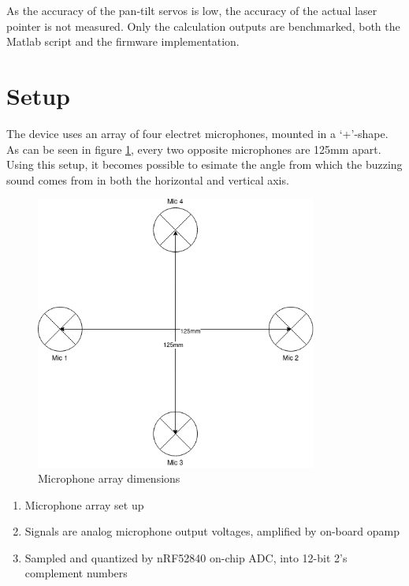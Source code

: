 \documentclass[a4paper]{article}
\begin{document}
As the accuracy of the pan-tilt servos is low, the accuracy of the actual laser pointer is not measured. Only the calculation outputs are benchmarked, both the Matlab script and the firmware implementation.

\section{Setup}

The device uses an array of four electret microphones, mounted in a `+'-shape. As can be seen in figure \ref{fig:mic_array_dimensions}, every two opposite microphones are 125mm apart. Using this setup, it becomes possible to esimate the angle from which the buzzing sound comes from in both the horizontal and vertical axis. 

\begin{figure}
    \begin{center}
        \includegraphics[width=25em]{assets/mic_array_dimensions.png}
        \caption{Microphone array dimensions}
        \label{fig:mic_array_dimensions}
    \end{center}
\end{figure}


\begin{enumerate}
    \item Microphone array set up
    \item Signals are analog microphone output voltages, amplified by on-board opamp
    \item Sampled and quantized by nRF52840 on-chip ADC, into 12-bit 2's complement numbers
\end{enumerate}
\end{document}
